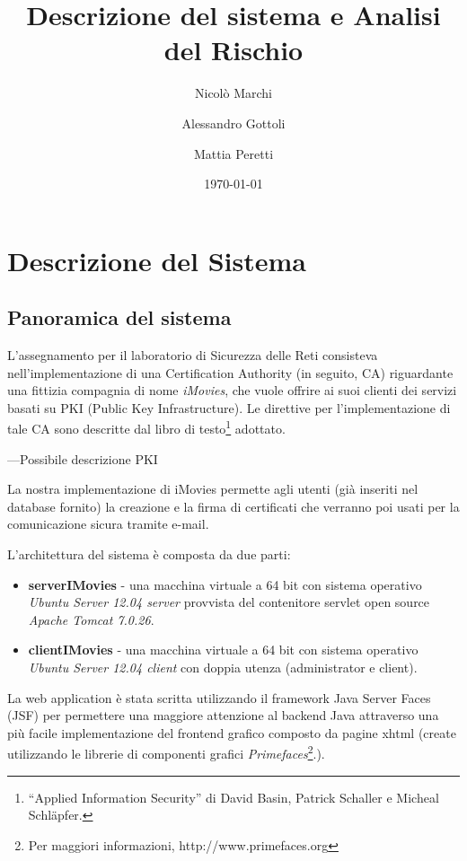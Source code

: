 \documentclass{article}
\title{\huge\sffamily\bfseries Descrizione del sistema e Analisi del Rischio}
\author{Nicolò Marchi \and Alessandro Gottoli \and Mattia Peretti}
\date{\today}
\begin{document}
\maketitle

\tableofcontents
\listoffigures
\pagebreak


\section{Descrizione del Sistema}

\subsection{Panoramica del sistema}

L'assegnamento per il laboratorio di Sicurezza delle Reti consisteva nell'implementazione di una Certification Authority (in seguito, CA) riguardante una fittizia compagnia di nome \emph{iMovies}, che vuole offrire ai suoi clienti dei servizi basati su PKI (Public Key Infrastructure).
Le direttive per l'implementazione di tale CA sono descritte dal libro di testo\footnote{``Applied Information Security'' di David Basin, Patrick Schaller e Micheal Schl\"apfer.} adottato.

---Possibile descrizione PKI

La nostra implementazione di iMovies permette agli utenti (già inseriti nel database fornito) la creazione e la firma di certificati che verranno poi usati per la comunicazione sicura tramite e-mail.

L'architettura del sistema è composta da due parti:
\begin{itemize}
\item \textbf{serverIMovies} - una macchina virtuale a 64 bit con sistema operativo \emph{Ubuntu Server 12.04 server} provvista del contenitore servlet open source \emph{Apache Tomcat 7.0.26}.
\item \textbf{clientIMovies} - una macchina virtuale a 64 bit con sistema operativo \emph{Ubuntu Server 12.04 client} con doppia utenza (administrator e client).
\end{itemize}

La web application è stata scritta utilizzando il framework Java Server Faces (JSF) per permettere una maggiore attenzione al backend Java attraverso una più facile implementazione del frontend grafico composto da pagine xhtml (create utilizzando le librerie di componenti grafici \emph{Primefaces}\footnote{Per maggiori informazioni, http://www.primefaces.org}.).
\end{document}
